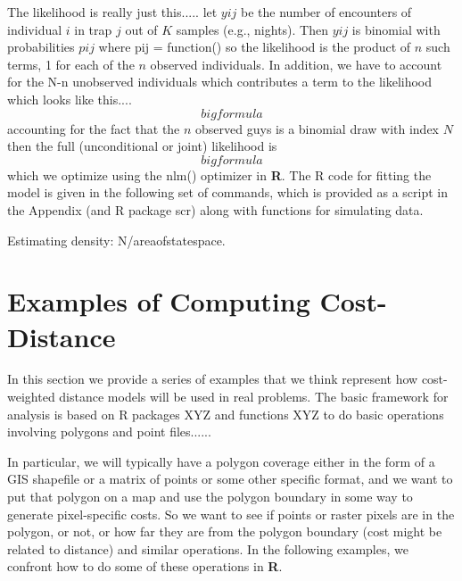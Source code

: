 The likelihood is really just this.....
let $yij$ be the number of encounters of individual $i$ in trap $j$ out of
$K$ samples (e.g., nights). Then $yij$ is binomial with probabilities
$pij$ where pij = function() so the likelihood is the product of $n$ such
terms, 1 for each of the $n$ observed individuals. 
In addition, we have to account for the N-n unobserved individuals which
contributes a term to the likelihood which looks like this....
\[
 big formula
\]
accounting for the fact that the $n$ observed guys is a binomial draw
with index $N$ then the full (unconditional or joint) likelihood is
\[
 big formula
\]
which we optimize using the nlm() optimizer in {\bf R}. The R code for 
fitting the model is given in the following set 
of commands, which is provided as a script in the Appendix (and R package
scr) along with functions for simulating data.

Estimating density: N/areaofstatespace.


\section{Examples of Computing Cost-Distance}

In this section we provide a series of examples that we think
represent how cost-weighted distance models will be used in real
problems. 
The basic framework for analysis is based on R packages XYZ
and functions XYZ to do basic operations involving polygons and point
files...... 

In particular, we will typically have a polygon coverage either in the
form of a GIS shapefile or a matrix of points or some other specific
format, and we want to put that polygon on a map and use the polygon
boundary in some way to generate pixel-specific costs. So we want to
see if points or raster pixels are in the polygon, or not, or how far
they are from the polygon boundary (cost might be related to distance)
and similar operations. In the following examples, we confront how to
do some of these operations in {\bf R}. 


